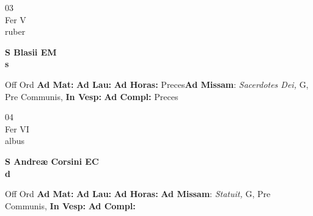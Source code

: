 \documentclass[10pt, openany]{book}
\begin{document}
        \begin{center}
            \begin{minipage}{3.5in}
                \vspace{2em}
                \begin{minipage}{0.5in}
                    {\Huge 03} \\
                    {\normalsize Fer V} \\
                    {\normalsize ruber}
                \end{minipage}
                \begin{minipage}{3.0in}
                    \textbf{ \large S Blasii EM \\
                    \textnormal{\normalsize s}} \\ 
                \end{minipage}
                \begin{justify}Off Ord
                    \textbf{Ad Mat: }
                    \textbf{Ad Lau: }
                    \textbf{Ad Horas: }Preces\textbf{Ad Missam}: \textit{Sacerdotes Dei,} G, Pre Communis,  
                    \textbf{In Vesp: }
                    \textbf{Ad Compl: }Preces
                \end{justify}
            \end{minipage}
        \end{center}
    
        \begin{center}
            \begin{minipage}{3.5in}
                \vspace{2em}
                \begin{minipage}{0.5in}
                    {\Huge 04} \\
                    {\normalsize Fer VI} \\
                    {\normalsize albus}
                \end{minipage}
                \begin{minipage}{3.0in}
                    \textbf{ \large S Andreæ Corsini EC \\
                    \textnormal{\normalsize d}} \\ 
                \end{minipage}
                \begin{justify}Off Ord
                    \textbf{Ad Mat: }
                    \textbf{Ad Lau: }
                    \textbf{Ad Horas: }\textbf{Ad Missam}: \textit{Statuit,} G, Pre Communis,  
                    \textbf{In Vesp: }
                    \textbf{Ad Compl: }
                \end{justify}
            \end{minipage}
        \end{center}
    
\end{document}
